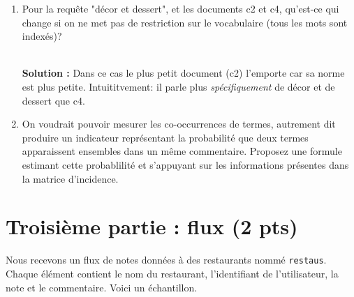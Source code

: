 \documentclass[11pt,a4paper]{article}
\newenvironment{solution}[0]{
~\\ \color{red} \textbf{Solution : }\color{black}}{%
}
\begin{document}
\begin{enumerate}
\begin{solution}
\begin{itemize}
  \item plat\,: c1 : $\frac{1}{\sqrt{2}}$;  
       c4 : $\frac{1}{\sqrt{3}}$; 
       c5 : $\frac{2}{\sqrt{6}}$; 
  
  \item décor et dessert\,: 
  
    c2 : $\frac{1+1}{\sqrt{3}}$; 
    c4 :  $\frac{1+1}{\sqrt{3}}$  
    c5 : $\frac{1}{\sqrt{6}}$; 

  \item vin et plat
  
    c1 : $\frac{1+1}{\sqrt{2}}$; 
    c2 : $\frac{1}{\sqrt{3}}$;
    c3 :  $\frac{2}{\sqrt{3}}$  
    c4 :  $\frac{1}{\sqrt{3}}$  
    c5 : $\frac{1+2}{\sqrt{6}}$; 
    
 \end{itemize}

\end{solution}  

   \item Pour la requête "décor et dessert", et les documents c2 et c4,
   qu'est-ce qui change si on ne met pas de restriction 
   sur le vocabulaire (tous les mots sont indexés)?
   
\begin{solution}
Dans ce cas le plus petit document (c2) l'emporte car sa norme est
plus petite. Intuititvement: il parle plus \emph{spécifiquement} de
décor et de dessert que c4.
\end{solution}   
    
\item On voudrait pouvoir mesurer les co-occurrences de termes, autrement dit
    produire un indicateur représentant la probabilité que deux termes
    apparaissent ensembles dans un même commentaire. Proposez une formule estimant
    cette probablilité et s'appuyant
      sur les informations présentes dans la matrice d'incidence.

\end{enumerate}


\section*{Troisième partie : flux (2 pts)}

Nous recevons un flux de notes données à des restaurants nommé \texttt{restaus}. Chaque
élément contient le nom du restaurant, l'identifiant
de l'utilisateur, la note et le commentaire. Voici un échantillon.
\end{document}
